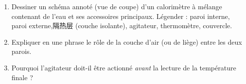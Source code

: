 \documentclass[11pt]{article}
\begin{document}
\begin{exercice}
\begin{enumerate}
    \item Dessiner un schéma annoté (vue de coupe) d'un calorimètre à mélange contenant de l'eau et ses accessoires principaux. Légender : paroi interne, paroi externe,隔热层 (couche isolante), agitateur, thermomètre, couvercle.
    \item Expliquer en une phrase le rôle de la couche d'air (ou de liège) entre les deux parois.
    \item Pourquoi l'agitateur doit-il être actionné \textit{avant} la lecture de la température finale ?
\end{enumerate}
\end{exercice}
\end{document}
